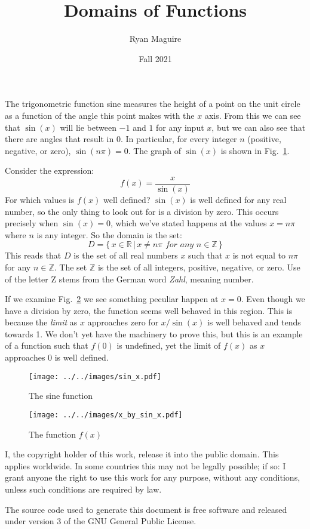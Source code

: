 \documentclass{article}
\title{Domains of Functions}
\author{Ryan Maguire}
\date{Fall 2021}
\begin{document}
    \maketitle
    The trigonometric function sine measures the height of a point on the
    unit circle as a function of the angle this point makes with the $x$ axis.
    From this we can see that $\sin(x)$ will lie between $-1$ and $1$ for any
    input $x$, but we can also see that there are angles that result in
    $0$. In particular, for every integer $n$ (positive, negative, or zero),
    $\sin(n\pi)=0$. The graph of $\sin(x)$ is shown in
    Fig.~\ref{fig:sin_x}.
    \par\hfill\par
    Consider the expression:
    \begin{equation}
        f(x)=\frac{x}{\sin(x)}
    \end{equation}
    For which values is $f(x)$ well defined? $\sin(x)$ is well defined for any
    real number, so the only thing to look out for is a division by zero.
    This occurs precisely when $\sin(x)=0$, which we've stated happens at the
    values $x=n\pi$ where $n$ is any integer. So the domain is the set:
    \begin{equation}
        D=\{\,x\in\mathbb{R}\,|\,x\ne{n\pi}\textit{ for any }n\in\mathbb{Z}\,\}
    \end{equation}
    This reads that $D$ is the set of all real numbers $x$ such that $x$ is
    not equal to $n\pi$ for any $n\in\mathbb{Z}$. The set $\mathbb{Z}$ is the
    set of all integers, positive, negative, or zero. Use of the letter Z stems
    from the German word \textit{Zahl}, meaning number.
    \par\hfill\par
    If we examine Fig.~\ref{fig:x_by_sin_x} we see something peculiar happen
    at $x=0$. Even though we have a division by zero, the function seems well
    behaved in this region. This is because the \textit{limit} as $x$
    approaches zero for $x/\sin(x)$ is well behaved and tends towards 1. We
    don't yet have the machinery to prove this, but this is an example of a
    function such that $f(0)$ is undefined, yet the limit of $f(x)$ as $x$
    approaches 0 is well defined.
    \begin{figure}
        \centering
        \texttt{[image: ../../images/sin\_x.pdf]}
        \caption{The sine function}
        \label{fig:sin_x}
    \end{figure}
    \begin{figure}
        \centering
        \texttt{[image: ../../images/x\_by\_sin\_x.pdf]}
        \caption{The function $f(x)$}
        \label{fig:x_by_sin_x}
    \end{figure}
    \newpage
    I, the copyright holder of this work, release it into the public domain.
    This applies worldwide. In some countries this may not be legally possible;
    if so: I grant anyone the right to use this work for any purpose, without
    any conditions, unless such conditions are required by law.
    \par\hfill\par
    The source code used to generate this document is free software and released
    under version 3 of the GNU General Public License.
\end{document}
